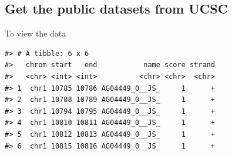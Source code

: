


\subsection{Get the public datasets from
UCSC}\label{get-the-public-datasets-from-ucsc}

\begin{Shaded}
\begin{Highlighting}[]
\end{Highlighting}
\end{Shaded}

\begin{Shaded}
\begin{Highlighting}[]
\NormalTok{(}\NormalTok{, }\NormalTok{, }\NormalTok{)}
\end{Highlighting}
\end{Shaded}

\begin{Shaded}
\begin{Highlighting}[]
\NormalTok{(}\NormalTok{, }\NormalTok{, }\NormalTok{)}
\end{Highlighting}
\end{Shaded}

To view the data

\begin{Shaded}
\begin{Highlighting}[]
\end{Highlighting}
\end{Shaded}

\begin{verbatim}
#> # A tibble: 6 x 6
#>   chrom start   end           name score strand
#>   <chr> <int> <int>          <chr> <chr>  <chr>
#> 1  chr1 10785 10786 AG04449_0__JS_     1      +
#> 2  chr1 10788 10789 AG04449_0__JS_     1      +
#> 3  chr1 10794 10795 AG04449_0__JS_     1      +
#> 4  chr1 10810 10811 AG04449_0__JS_     1      +
#> 5  chr1 10812 10813 AG04449_0__JS_     1      +
#> 6  chr1 10815 10816 AG04449_0__JS_     1      +
\end{verbatim}

